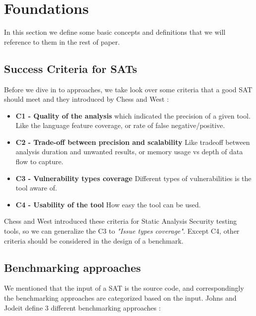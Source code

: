 \documentclass[authoryear,preprint]{sigplanconf}
\begin{document}
\section{Foundations}
\label{sec:sec_approaches}

In this section we define some basic concepts and definitions that we will reference to them in the rest of paper. 

\subsection{Success Criteria for SATs}
\label{sec:subsec_successc}

Before we dive in to approaches, we take look over some criteria that a good SAT should meet and they introduced by Chess and West \cite{Chess:2007:SPS:1406221}:

\begin{itemize}
	\item \textbf{C1 - Quality of the analysis} which indicated the precision of a given tool. Like the language feature coverage, or rate of false negative/positive.
	\item \textbf{C2 - Trade-off between precision and scalability} Like tradeoff between analysis duration and unwanted results, or memory usage vs depth of data flow to capture. 
	\item \textbf{C3 - Vulnerability types coverage} Different types of vulnerabilities is the tool aware of. 
	\item \textbf{C4 - Usability of the tool} How easy the tool can be used.
\end{itemize}

Chess and West introduced these criteria for Static Analysis Security testing tools, so we can generalize the C3 to \textit{"Issue types coverage"}. Except C4, other criteria should be considered in the design of a benchmark. 

\subsection{Benchmarking approaches}

We mentioned that the input of a SAT is the source code, and correspondingly the benchmarking approaches are categorized based on the input. Johns and Jodeit define 3 different benchmarking approaches \cite{Scanstud}: 
\end{document}
